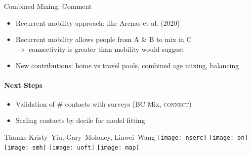 \begin{frame}{Combined Mixing: Comment}
  \begin{itemize}
    \item Recurrent mobility approach: like Arenas et al. (2020)
    \item Recurrent mobility allows people from A \& B to mix in C\\
          $\rightarrow$ connectivity is greater than mobility would suggest
    \item New contributions: home vs travel pools, combined age mixing, balancing
  \end{itemize}
  \bigpar
  \paragraph{Next Steps}
  \begin{itemize}
    \item Validation of \# contacts with \covid surveys (BC Mix, \textsc{connect})
    \item Scaling contacts by decile for model fitting
  \end{itemize}
\end{frame}
\begin{frame}{Thanks}
  \centering
  Kristy~Yiu, Gary~Moloney, Linwei~Wang
  \vfill\hfill\hfill
  \texttt{[image: nserc]}\hfill
  \texttt{[image: on]}\hfill
  \texttt{[image: smh]}
  \hfill\hfill\null\bigpar\hfill\hfill
  \texttt{[image: uoft]}\hfill
  \texttt{[image: map]}
  \hfill\hfill\null
\end{frame}